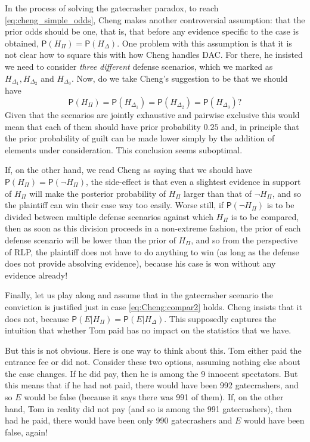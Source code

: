 \documentclass[10pt,dvipsnames,enabledeprecatedfontcommands]{scrartcl}
\newcommand{\n}{\neg}
\newcommand{\pr}[1]{\mathsf{P}(#1)}
\begin{document}
In the process of solving the gatecrasher paradox, to reach
\eqref{eq:cheng_simple_odds}, Cheng makes another controversial
assumption: that the prior odds should be one, that is, that before any
evidence specific to the case is obtained, \(\pr{H_\Pi}=\pr{H_\Delta}\).
One problem with this assumption is that it is not clear how to square
this with how Cheng handles DAC. For there, he insisted we need to
consider \emph{three different} defense scenarios, which we marked as
\(H_{\Delta_1}, H_{\Delta_2}\) and \(H_{\Delta_3}\). Now, do we take
Cheng's suggestion to be that we should have
\[\pr{H_\Pi}=\pr{H_{\Delta_1}}= \pr{H_{\Delta_2}}=\pr{H_{\Delta_3}}?\]
\noindent Given that the scenarios are jointly exhaustive and pairwise
exclusive this would mean that each of them should have prior
probability \(0.25\) and, in principle that the prior probability of
guilt can be made lower simply by the addition of elements under
consideration. This conclusion seems suboptimal.

If, on the other hand, we read Cheng as saying that we should have
\(\pr{H_\Pi}=\pr{\n H_\Pi}\), the side-effect is that even a slightest
evidence in support of \(H_\Pi\) will make the posterior probability of
\(H_\Pi\) larger than that of \(\n H_\Pi\), and so the plaintiff can win
their case way too easily. Worse still, if \(\pr{\n H_\Pi}\) is to be
divided between multiple defense scenarios against which \(H_\Pi\) is to
be compared, then as soon as this division proceeds in a non-extreme
fashion, the prior of each defense scenario will be lower than the prior
of \(H_\Pi\), and so from the perspective of RLP, the plaintiff does not
have to do anything to win (as long as the defense does not provide
absolving evidence), because his case is won without any evidence
already!

Finally, let us play along and assume that in the gatecrasher scenario
the conviction is justified just in case \eqref{eq:Cheng:compar2} holds.
Cheng insists that it does not, because
\(\pr{E\vert H_\Pi}=\pr{E\vert H_\Delta}\). This supposedly captures the
intuition that whether Tom paid has no impact on the statistics that we
have.

But this is not obvious. Here is one way to think about this. Tom either
paid the entrance fee or did not. Consider these two options, assuming
nothing else about the case changes. If he did pay, then he is among the
9 innocent spectators. But this means that if he had not paid, there
would have been 992 gatecrashers, and so \(E\) would be false (because
it says there was 991 of them). If, on the other hand, Tom in reality
did not pay (and so is among the 991 gatecrashers), then had he paid,
there would have been only 990 gatecrashers and \(E\) would have been
false, again!
\end{document}

